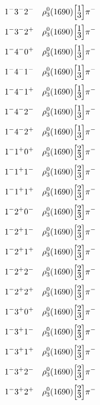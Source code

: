 \documentclass[10pt,a4paper]{article}
\def\dst{\displaystyle}
\def\vsp{\hbox{\vrule height12.5pt depth3.5pt width0pt}}
\def\ells#1#2{\Big[\hskip-5pt\vsp\begin{array}{c}\dst#1\\[-4pt]\dst#2\end{array}\vsp\hskip-5pt\Big]}
\begin{document}
\begin{align*} 
 \begin{aligned}
1^{-}3^{-}2^{-}\quad & \rho_3^0(1690)\ells{1}{3}\pi^-\\
1^{-}3^{-}2^{+}\quad & \rho_3^0(1690)\ells{1}{3}\pi^-\\
1^{-}4^{-}0^{+}\quad & \rho_3^0(1690)\ells{1}{3}\pi^-\\
1^{-}4^{-}1^{-}\quad & \rho_3^0(1690)\ells{1}{3}\pi^-\\
1^{-}4^{-}1^{+}\quad & \rho_3^0(1690)\ells{1}{3}\pi^-\\
1^{-}4^{-}2^{-}\quad & \rho_3^0(1690)\ells{1}{3}\pi^-\\
1^{-}4^{-}2^{+}\quad & \rho_3^0(1690)\ells{1}{3}\pi^-\\
1^{-}1^{+}0^{+}\quad & \rho_3^0(1690)\ells{2}{3}\pi^-\\
1^{-}1^{+}1^{-}\quad & \rho_3^0(1690)\ells{2}{3}\pi^-\\
1^{-}1^{+}1^{+}\quad & \rho_3^0(1690)\ells{2}{3}\pi^-\\
1^{-}2^{+}0^{-}\quad & \rho_3^0(1690)\ells{2}{3}\pi^-\\
1^{-}2^{+}1^{-}\quad & \rho_3^0(1690)\ells{2}{3}\pi^-\\
1^{-}2^{+}1^{+}\quad & \rho_3^0(1690)\ells{2}{3}\pi^-\\
1^{-}2^{+}2^{-}\quad & \rho_3^0(1690)\ells{2}{3}\pi^-\\
1^{-}2^{+}2^{+}\quad & \rho_3^0(1690)\ells{2}{3}\pi^-\\
1^{-}3^{+}0^{+}\quad & \rho_3^0(1690)\ells{2}{3}\pi^-\\
1^{-}3^{+}1^{-}\quad & \rho_3^0(1690)\ells{2}{3}\pi^-\\
1^{-}3^{+}1^{+}\quad & \rho_3^0(1690)\ells{2}{3}\pi^-\\
1^{-}3^{+}2^{-}\quad & \rho_3^0(1690)\ells{2}{3}\pi^-\\
1^{-}3^{+}2^{+}\quad & \rho_3^0(1690)\ells{2}{3}\pi^-\\
\end{aligned} 
 \end{align*}\pagebreak
\end{document}
